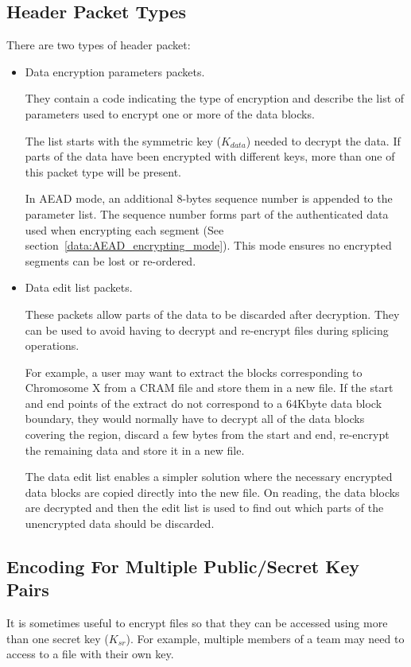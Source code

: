 \documentclass[10pt]{article}
\begin{document}
\subsection{Header Packet Types}\label{overview:header_packet_types}
There are two types of header packet:
\begin{itemize}
\item Data encryption parameters packets.

They contain a code indicating the type of encryption and describe the list of parameters used to encrypt one or more of the data blocks.

The list starts with the symmetric key ($K_{data}$) needed to decrypt the data.
If parts of the data have been encrypted with different keys, more than one of this packet type will be present.

In AEAD mode, an additional 8-bytes sequence number is appended to the
parameter list. The sequence number forms part of the authenticated
data used when encrypting each segment (See
section~\ref{data:AEAD_encrypting_mode}).
%
This mode ensures no encrypted segments can be lost or re-ordered.

\item Data edit list packets.

These packets allow parts of the data to be discarded after decryption.
They can be used to avoid having to decrypt and re-encrypt files during splicing operations.

For example, a user may want to extract the blocks corresponding to Chromosome X from a CRAM file and store them
in a new file.
If the start and end points of the extract do not correspond to a 64Kbyte data block boundary, they would normally
have to decrypt all of the data blocks covering the region, discard a few bytes from the start and end, re-encrypt the
remaining data and store it in a new file.

The data edit list enables a simpler solution where the necessary encrypted data blocks are copied directly into
the new file.
On reading, the data blocks are decrypted and then the edit list is used to find out which parts of the unencrypted
data should be discarded.
\end{itemize}

\subsection{Encoding For Multiple Public/Secret Key Pairs}

It is sometimes useful to encrypt files so that they can be accessed using more than one secret key ($K_{sr}$).
For example, multiple members of a team may need to access to a file with their own key.
\end{document}
